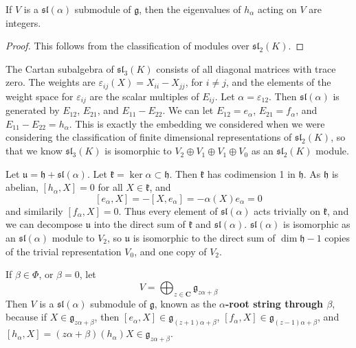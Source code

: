 \begin{lemma}
    If $V$ is a $\mathfrak{sl}(\alpha)$ submodule of $\mathfrak{g}$, then the eigenvalues of $h_\alpha$ acting on $V$ are integers.
\end{lemma}
\begin{proof}
    This follows from the classification of modules over $\mathfrak{sl}_2(K)$.
\end{proof}

\begin{example}
    The Cartan subalgebra of $\mathfrak{sl}_3(K)$ consists of all diagonal matrices with trace zero. The weights are $\varepsilon_{ij}(X) = X_{ii} - X_{jj}$, for $i \neq j$, and the elements of the weight space for $\varepsilon_{ij}$ are the scalar multiples of $E_{ij}$. Let $\alpha = \varepsilon_{12}$. Then $\mathfrak{sl}(\alpha)$ is generated by $E_{12}$, $E_{21}$, and $E_{11} - E_{22}$. We can let $E_{12} = e_\alpha$, $E_{21} = f_\alpha$, and $E_{11} - E_{22} = h_\alpha$. This is exactly the embedding we considered when we were considering the classification of finite dimensional representations of $\mathfrak{sl}_2(K)$, so that we know $\mathfrak{sl}_3(K)$ is isomorphic to $V_2 \oplus V_1 \oplus V_1 \oplus V_0$ as an $\mathfrak{sl}_2(K)$ module.
\end{example}

\begin{example}
    Let $\mathfrak{u} = \mathfrak{h} + \mathfrak{sl}(\alpha)$. Let $\mathfrak{k} = \ker \alpha \subset \mathfrak{h}$. Then $\mathfrak{k}$ has codimension 1 in $\mathfrak{h}$. As $\mathfrak{h}$ is abelian, $[h_\alpha,X] = 0$ for all $X \in \mathfrak{k}$, and
    \[ [e_\alpha, X] = - [X, e_\alpha] = -\alpha(X) e_\alpha = 0 \]
    and similarily $[f_\alpha, X] = 0$. Thus every element of $\mathfrak{sl}(\alpha)$ acts trivially on $\mathfrak{k}$, and we can decompose $\mathfrak{u}$ into the direct sum of $\mathfrak{k}$ and $\mathfrak{sl}(\alpha)$. $\mathfrak{sl}(\alpha)$ is isomorphic as an $\mathfrak{sl}(\alpha)$ module to $V_2$, so $\mathfrak{u}$ is isomorphic to the direct sum of $\dim \mathfrak{h} - 1$ copies of the trivial representation $V_0$, and one copy of $V_2$.
\end{example}

\begin{example}
    If $\beta \in \Phi$, or $\beta = 0$, let
    \[ V = \bigoplus_{z \in \mathbf{C}} \mathfrak{g}_{z\alpha + \beta} \]
    Then $V$ is a $\mathfrak{sl}(\alpha)$ submodule of $\mathfrak{g}$, known as the {\bf $\alpha$-root string through $\beta$}, because if $X \in \mathfrak{g}_{z\alpha + \beta}$, then $[e_\alpha, X] \in \mathfrak{g}_{(z + 1)\alpha + \beta}$, $[f_\alpha, X] \in \mathfrak{g}_{(z-1)\alpha + \beta}$, and $[h_\alpha,X] = (z\alpha + \beta)(h_\alpha) X \in \mathfrak{g}_{z\alpha + \beta}$.
\end{example}

